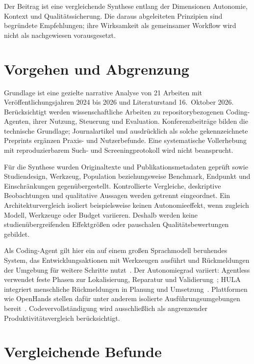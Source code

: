 \documentclass[conference]{IEEEtran}
\begin{document}
Der Beitrag ist eine vergleichende Synthese entlang der Dimensionen Autonomie, Kontext und Qualitätssicherung. Die daraus abgeleiteten Prinzipien sind begründete Empfehlungen; ihre Wirksamkeit als gemeinsamer Workflow wird nicht als nachgewiesen vorausgesetzt.

\section{Vorgehen und Abgrenzung}
Grundlage ist eine gezielte narrative Analyse von 21 Arbeiten mit Veröffentlichungsjahren 2024 bis 2026 und Literaturstand 16.~Oktober 2026. Berücksichtigt werden wissenschaftliche Arbeiten zu repositorybezogenen Coding-Agenten, ihrer Nutzung, Steuerung und Evaluation. Konferenzbeiträge bilden die technische Grundlage; Journalartikel und ausdrücklich als solche gekennzeichnete Preprints ergänzen Praxis- und Nutzerbefunde. Eine systematische Vollerhebung mit reproduzierbarem Such- und Screeningprotokoll wird nicht beansprucht.

Für die Synthese wurden Originaltexte und Publikationsmetadaten geprüft sowie Studiendesign, Werkzeug, Population beziehungsweise Benchmark, Endpunkt und Einschränkungen gegenübergestellt. Kontrollierte Vergleiche, deskriptive Beobachtungen und qualitative Aussagen werden getrennt eingeordnet. Ein Architekturvergleich isoliert beispielsweise keinen Autonomieeffekt, wenn zugleich Modell, Werkzeuge oder Budget variieren. Deshalb werden keine studienübergreifenden Effektgrößen oder pauschalen Qualitätsbewertungen gebildet.

Als Coding-Agent gilt hier ein auf einem großen Sprachmodell beruhendes System, das Entwicklungsaktionen mit Werkzeugen ausführt und Rückmeldungen der Umgebung für weitere Schritte nutzt~\cite{liu2024agentsurvey}. Der Autonomiegrad variiert: Agentless verwendet feste Phasen zur Lokalisierung, Reparatur und Validierung~\cite{xia2025agentless}; HULA integriert menschliche Rückmeldungen in Planung und Umsetzung~\cite{takerngsaksiri2025hula}. Plattformen wie OpenHands stellen dafür unter anderem isolierte Ausführungsumgebungen bereit~\cite{wang2025openhands}. Codevervollständigung wird ausschließlich als angrenzender Produktivitätsvergleich berücksichtigt.

\section{Vergleichende Befunde}
\end{document}
